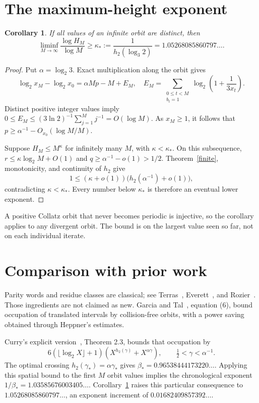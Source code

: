 \documentclass[11pt]{article}
\newtheorem{corollary}[theorem]{Corollary}
\newcommand{\hh}{h_2}
\begin{document}
\section{The maximum-height exponent}
\begin{corollary}\label{height}
If all values of an infinite orbit are distinct, then
\[
\liminf_{M\to\infty}\frac{\log H_M}{\log M}
\ge \kappa_*:=\frac1{\hh(\log_3 2)}
=1.05268085860797\ldots.
\]
\end{corollary}
\begin{proof}
Put $\alpha=\log_2 3$. Exact multiplication along the orbit gives
\[
\log_2x_M-\log_2x_0=\alpha Mp-M+E_M,
\quad
E_M=\sum_{\substack{0\le t<M\\b_t=1}}
\log_2\left(1+\frac1{3x_t}\right).
\]
Distinct positive integer values imply
$0\le E_M\le(3\ln2)^{-1}\sum_{j=1}^M j^{-1}=O(\log M)$.
As $x_M\ge1$, it follows that
$p\ge\alpha^{-1}-O_{x_0}(\log M/M)$.

Suppose $H_M\le M^\kappa$ for infinitely many $M$, with
$\kappa<\kappa_*$. On this subsequence,
$r\le\kappa\log_2M+O(1)$ and
$q\ge\alpha^{-1}-o(1)>1/2$.
Theorem~\ref{finite}, monotonicity, and continuity of $\hh$ give
\[
1\le(\kappa+o(1))\bigl(\hh(\alpha^{-1})+o(1)\bigr),
\]
contradicting $\kappa<\kappa_*$. Every number below $\kappa_*$ is therefore an eventual lower exponent.
\end{proof}
A positive Collatz orbit that never becomes periodic is injective, so the corollary applies to any divergent orbit. The bound is on the largest value seen so far, not on each individual iterate.

\section{Comparison with prior work}
Parity words and residue classes are classical; see Terras~\cite{terras}, Everett~\cite{everett}, and Rozier~\cite{rozier}. Those ingredients are not claimed as new.
Garcia and Tal~\cite{gt}, equation (6), bound occupation of translated intervals by collision-free orbits, with a power saving obtained through Heppner's estimates.

Curry's explicit version~\cite{curry}, Theorem 2.3, bounds that occupation by
\[
6(\lfloor\log_2X\rfloor+1)
\left(X^{\hh(\gamma)}+X^{\alpha\gamma}\right),
\qquad \tfrac12<\gamma<\alpha^{-1}.
\]
The optimal crossing $\hh(\gamma_*)=\alpha\gamma_*$ gives
$\beta_*=0.96538444173220\ldots$.
Applying this spatial bound to the first $M$ orbit values implies the chronological exponent
$1/\beta_*=1.03585676003405\ldots$.
Corollary~\ref{height} raises this particular consequence to $1.05268085860797\ldots$, an exponent increment of $0.01682409857392\ldots$.
\end{document}
